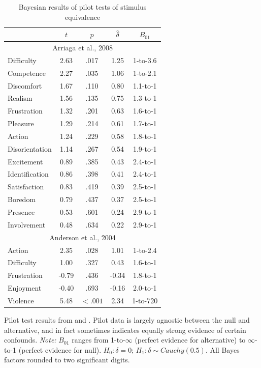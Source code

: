 \documentclass[man]{apa6}
\begin{document}
\begin{singlespace}
\begin{table}
\caption{Bayesian results of pilot tests of stimulus equivalence}
\begin{center}
\begin{tabular}{lcccc} 
&$t$&$p$&$\hat{\delta}$&$B_{01}$ \\ \hline
\multicolumn{5}{c}{Arriaga et al., 2008} \\
Difficulty&2.63&.017&1.25&1-to-3.6 \\
Competence&2.27&.035&1.06&1-to-2.1 \\
Discomfort&1.67&.110&0.80&1.1-to-1 \\ 
Realism&1.56&.135&0.75&1.3-to-1 \\
Frustration&1.32&.201&0.63&1.6-to-1 \\
Pleasure&1.29&.214&0.61&1.7-to-1 \\
Action&1.24&.229&0.58&1.8-to-1 \\
Disorientation&1.14&.267&0.54&1.9-to-1 \\ 
Excitement&0.89&.385&0.43&2.4-to-1 \\
Identification&0.86&.398&0.41&2.4-to-1 \\
Satisfaction&0.83&.419&0.39&2.5-to-1 \\ 
Boredom&0.79&.437&0.37&2.5-to-1 \\ 
Presence&0.53&.601&0.24&2.9-to-1 \\
Involvement&0.48&.634&0.22&2.9-to-1 \\
\multicolumn{5}{c}{Anderson et al., 2004}\\
Action&2.35&.028&1.01&1-to-2.4 \\
Difficulty&1.00&.327&0.43&1.6-to-1 \\
Frustration&-0.79&.436&-0.34&1.8-to-1 \\
Enjoyment&-0.40&.693&-0.16&2.0-to-1 \\
Violence&5.48&$<.001$&2.34&1-to-720 \\ \hline
\end{tabular}
\end{center}

\vspace{4mm}
Pilot test results from \citet{Arriaga:etal:2008} and \citet{Anderson:etal:2004}. Pilot data is largely agnostic between the null and alternative, and in fact sometimes indicates equally strong evidence of certain confounds. {\em Note:} $B_{01}$ ranges from 1-to-$\infty$ (perfect evidence for alternative) to $\infty$-to-1 (perfect evidence for null). $H_0: \delta = 0$; $H_1: \delta \sim Cauchy(0.5)$. All Bayes factors rounded to two significant digits.
\label{ArriagaAndersonPilot}
\end{table}
\end{singlespace}
\end{document}
